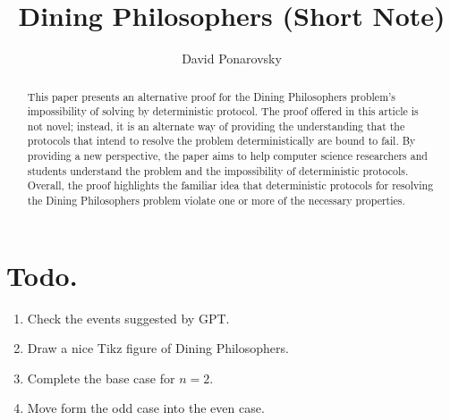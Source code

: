\documentclass[manuscript,screen,review]{acmart}
\begin{document}


\title{Dining Philosophers (Short Note)} 
\author{David Ponarovsky}

\ifdefined\ACM
\else
  \maketitle
\fi

\begin{abstract} 
This paper presents an alternative proof for the Dining Philosophers problem's impossibility of solving by deterministic protocol. The proof offered in this article is not novel; instead, it is an alternate way of providing the understanding that the protocols that intend to resolve the problem deterministically are bound to fail. By providing a new perspective, the paper aims to help computer science researchers and students understand the problem and the impossibility of deterministic protocols. Overall, the proof highlights the familiar idea that deterministic protocols for resolving the Dining Philosophers problem violate one or more of the necessary properties.
\end{abstract}

%
\ifdefined\ACM
  \maketitle
\fi

% 
%


\newcommand{\Oh}{{\mathcal{O}}}
\newcommand{\bitsize}{N}
\newcommand{\longversion}[1]{#1}
\newcommand{\abpartization}{{\sc Vertex $(r,\ell)$-Partization}}


\section{Todo.}
\begin{enumerate}
  \item Check the events suggested by GPT.  
  \item Draw a nice Tikz figure of Dining Philosophers.   
  \item Complete the base case for $n=2$.  
  \item Move form the odd case into the even case. 
\end{enumerate}
\end{document}
